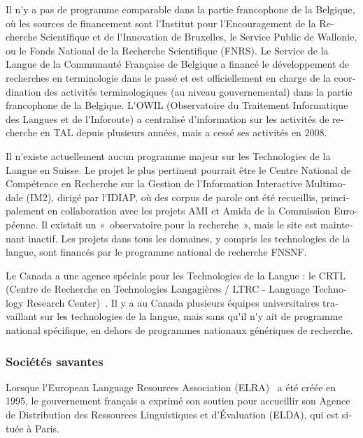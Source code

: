 \begin{french}
\begin{multicols}{2}
Il n{\mbox '}y a pas de programme comparable dans la partie francophone de la
Belgique, où les sources de financement sont l{\mbox '}Institut pour
l{\mbox '}Encouragement de la Recherche Scientifique et de l{\mbox '}Innovation de
Bruxelles, le Service Public de Wallonie, ou le Fonds National de la
Recherche Scientifique (FNRS). Le Service de la Langue de la
Communauté Française de Belgique a financé le développement de
recherches en terminologie dans le passé et est officiellement en
charge de la coordination des activités terminologiques (au niveau
gouvernemental) dans la partie francophone de la Belgique. L{\mbox '}OWIL
(Observatoire du Traitement Informatique des Langues et de
l{\mbox '}Inforoute) a centralisé d{\mbox '}information sur les activités de recherche
en TAL depuis plusieurs années, mais a cessé ses activités en 2008.

Il n{\mbox '}existe actuellement aucun programme majeur sur les Technologies
de la Langue en Suisse. Le projet le plus pertinent pourrait être le
Centre National de Compétence en Recherche sur la Gestion de
l{\mbox '}Information Interactive Multimodale (IM2), dirigé par l{\mbox '}IDIAP, où
des corpus de parole ont été recueillis, principalement en
collaboration avec les projets AMI et Amida de la Commission Européenne. Il existait un
«~observatoire pour la recherche~», mais le site est maintenant
inactif. Les projets dans tous les domaines, y compris les
technologies de la langue, sont financés par le programme national de
recherche FNSNF.

Le Canada a une agence spéciale pour les Technologies de la Langue :
le CRTL (Centre de Recherche en Technologies Langagières / LTRC -
Language Technology Research Center)~\cite{canadacrtl}. Il y a au
Canada plusieurs équipes universitaires travaillant sur les
technologies de la langue, mais sans qu{\mbox '}il n{\mbox '}y ait de
programme national spécifique, en dehors de programmes nationaux
génériques de recherche.

\subsubsection{Sociétés savantes}

Lorsque l{\mbox '}European Language Resources Association (ELRA)~\cite{elra} a été créée
en 1995, le gouvernement français a exprimé son soutien pour
accueillir son Agence de Distribution des Ressources Linguistiques et
d{\mbox '}Évaluation (ELDA), qui est située à Paris.


\end{multicols}
\end{french}
